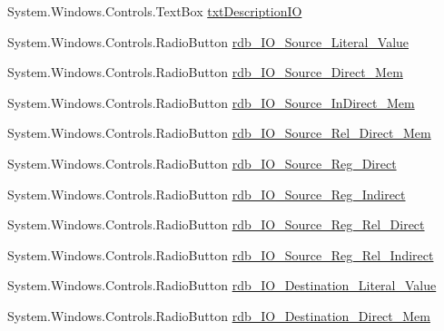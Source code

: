 \begin{DoxyCompactItemize}
\item 
System.\+Windows.\+Controls.\+Text\+Box \hyperlink{class_c_p_u___o_s___simulator_1_1_instructions_window_a278020eeca6ae302ab5530cca856acde}{txt\+Description\+I\+O}
\item 
System.\+Windows.\+Controls.\+Radio\+Button \hyperlink{class_c_p_u___o_s___simulator_1_1_instructions_window_a9182807a9c980105538a5749a7c114b2}{rdb\+\_\+\+I\+O\+\_\+\+Source\+\_\+\+Literal\+\_\+\+Value}
\item 
System.\+Windows.\+Controls.\+Radio\+Button \hyperlink{class_c_p_u___o_s___simulator_1_1_instructions_window_a93e07268bc61232b63ac9eb86534724d}{rdb\+\_\+\+I\+O\+\_\+\+Source\+\_\+\+Direct\+\_\+\+Mem}
\item 
System.\+Windows.\+Controls.\+Radio\+Button \hyperlink{class_c_p_u___o_s___simulator_1_1_instructions_window_a33e9c76335c339dcdb2be039d69f3ad9}{rdb\+\_\+\+I\+O\+\_\+\+Source\+\_\+\+In\+Direct\+\_\+\+Mem}
\item 
System.\+Windows.\+Controls.\+Radio\+Button \hyperlink{class_c_p_u___o_s___simulator_1_1_instructions_window_ae0af9c422f26476cbec1f1d36320418f}{rdb\+\_\+\+I\+O\+\_\+\+Source\+\_\+\+Rel\+\_\+\+Direct\+\_\+\+Mem}
\item 
System.\+Windows.\+Controls.\+Radio\+Button \hyperlink{class_c_p_u___o_s___simulator_1_1_instructions_window_aab5ed9c90650897a9267f8687dd7c086}{rdb\+\_\+\+I\+O\+\_\+\+Source\+\_\+\+Reg\+\_\+\+Direct}
\item 
System.\+Windows.\+Controls.\+Radio\+Button \hyperlink{class_c_p_u___o_s___simulator_1_1_instructions_window_aaf9918358410cdd5038e7b7e01bd5525}{rdb\+\_\+\+I\+O\+\_\+\+Source\+\_\+\+Reg\+\_\+\+Indirect}
\item 
System.\+Windows.\+Controls.\+Radio\+Button \hyperlink{class_c_p_u___o_s___simulator_1_1_instructions_window_a5560c9e467e7a1186a566f125183266e}{rdb\+\_\+\+I\+O\+\_\+\+Source\+\_\+\+Reg\+\_\+\+Rel\+\_\+\+Direct}
\item 
System.\+Windows.\+Controls.\+Radio\+Button \hyperlink{class_c_p_u___o_s___simulator_1_1_instructions_window_a36d5cbb73576e2070ad4fb978958067b}{rdb\+\_\+\+I\+O\+\_\+\+Source\+\_\+\+Reg\+\_\+\+Rel\+\_\+\+Indirect}
\item 
System.\+Windows.\+Controls.\+Radio\+Button \hyperlink{class_c_p_u___o_s___simulator_1_1_instructions_window_aa38a08597a11d3ad38a006bfcc145598}{rdb\+\_\+\+I\+O\+\_\+\+Destination\+\_\+\+Literal\+\_\+\+Value}
\item 
System.\+Windows.\+Controls.\+Radio\+Button \hyperlink{class_c_p_u___o_s___simulator_1_1_instructions_window_a164446dfc7b289d06e9fe29207b0f149}{rdb\+\_\+\+I\+O\+\_\+\+Destination\+\_\+\+Direct\+\_\+\+Mem}

\end{DoxyCompactItemize}

